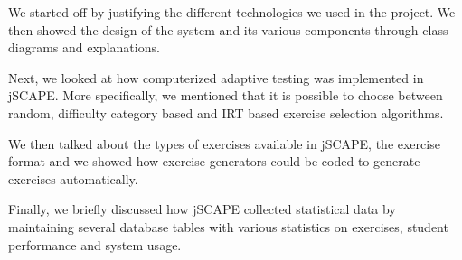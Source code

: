 We started off by justifying the different technologies we used in the project. We then showed the design of the system and its various components through class diagrams and explanations.\newline

Next, we looked at how computerized adaptive testing was implemented in jSCAPE. More specifically, we mentioned that it is possible to choose between random, difficulty category based and IRT based exercise selection algorithms. \newline

We then talked about the types of exercises available in jSCAPE, the exercise format and we showed how exercise generators could be coded to generate exercises automatically.\newline

Finally, we briefly discussed how jSCAPE collected statistical data by maintaining several database tables with various statistics on exercises, student performance and system usage.
